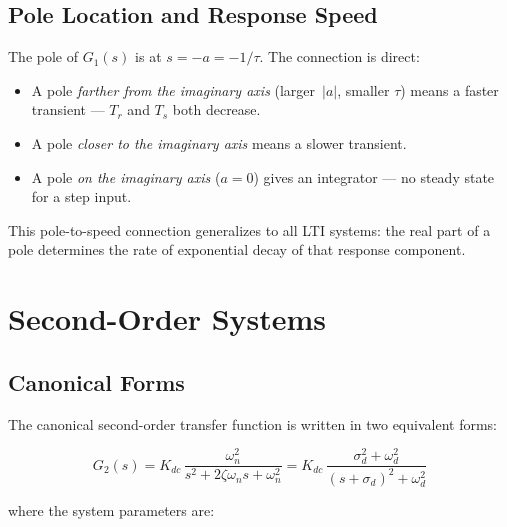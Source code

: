 \documentclass[../../book.tex]{subfiles}
\begin{document}
\subsection{Pole Location and Response Speed}
\label{sec:first_pole}

The pole of $G_1(s)$ is at $s = -a = -1/\tau$.  The connection is direct:
\begin{itemize}
  \item A pole \emph{farther from the imaginary axis} (larger~$|a|$, smaller
    $\tau$) means a faster transient --- $T_r$ and $T_s$ both decrease.
  \item A pole \emph{closer to the imaginary axis} means a slower transient.
  \item A pole \emph{on the imaginary axis} ($a = 0$) gives an integrator ---
    no steady state for a step input.
\end{itemize}

This pole-to-speed connection generalizes to all LTI systems: the real part
of a pole determines the rate of exponential decay of that response component.

\section{Second-Order Systems}
\label{sec:second}

\subsection{Canonical Forms}
\label{sec:second_forms}

The canonical second-order transfer function is written in two equivalent forms:

\begin{equation}
  G_2(s)
    = K_{dc}\,\frac{\omega_n^2}{s^2 + 2\zeta\omega_n s + \omega_n^2}
    = K_{dc}\,\frac{\sigma_d^2 + \omega_d^2}{(s+\sigma_d)^2 + \omega_d^2}
  \label{eq:G2}
\end{equation}

where the system parameters are:
\end{document}
